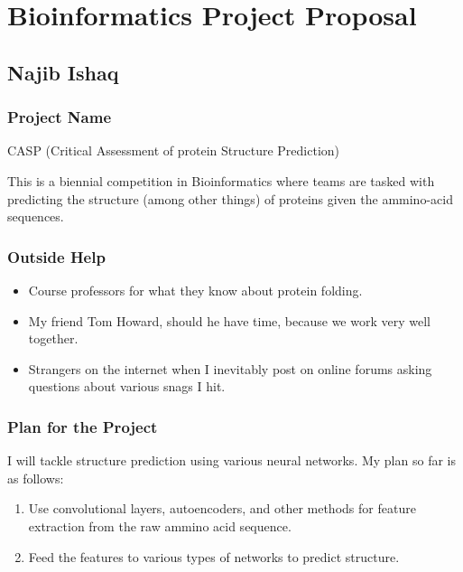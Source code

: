 \documentclass[]{article}
\date{}
\providecommand{\tightlist}{%
  \setlength{\itemsep}{0pt}\setlength{\parskip}{0pt}}
\begin{document}
\section{Bioinformatics Project
Proposal}\label{bioinformatics-project-proposal}

\subsection{Najib Ishaq}\label{najib-ishaq}

\subsubsection{Project Name}\label{project-name}

CASP (Critical Assessment of protein Structure Prediction)

This is a biennial competition in Bioinformatics where teams are tasked
with predicting the structure (among other things) of proteins given the
ammino-acid sequences.

\subsubsection{Outside Help}\label{outside-help}

\begin{itemize}
\tightlist
\item
  Course professors for what they know about protein folding.
\item
  My friend Tom Howard, should he have time, because we work very well
  together.
\item
  Strangers on the internet when I inevitably post on online forums
  asking questions about various snags I hit.
\end{itemize}

\subsubsection{Plan for the Project}\label{plan-for-the-project}

I will tackle structure prediction using various neural networks. My
plan so far is as follows:

\begin{enumerate}
\def\labelenumi{\arabic{enumi}.}
\tightlist
\item
  Use convolutional layers, autoencoders, and other methods for feature
  extraction from the raw ammino acid sequence.
\item
  Feed the features to various types of networks to predict structure.
\end{enumerate}
\end{document}
